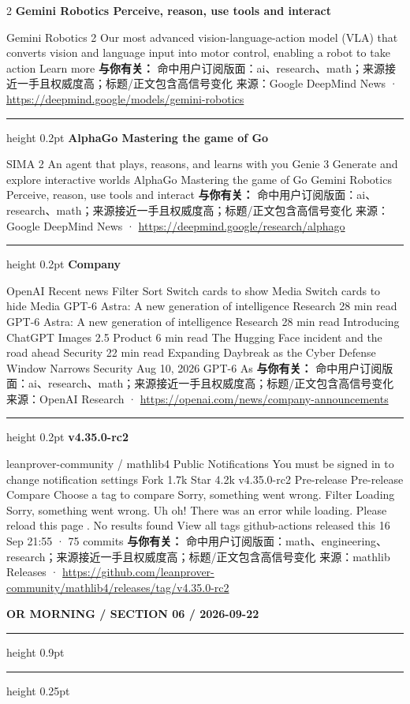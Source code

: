 \documentclass[10.5pt]{ctexart}
\begin{document}
\begin{multicols}{2}
{\large\bfseries Gemini Robotics Perceive, reason, use tools and interact}\par
Gemini Robotics 2 Our most advanced vision-language-action model (VLA) that converts vision and language input into motor control, enabling a robot to take action Learn more
\textbf{与你有关：} 命中用户订阅版面：ai、research、math；来源接近一手且权威度高；标题/正文包含高信号变化
{\footnotesize\color{ormuted} 来源：Google DeepMind News · \url{https://deepmind.google/models/gemini-robotics}}
\vspace{2mm}
\hrule height 0.2pt
\vspace{2mm}
{\large\bfseries AlphaGo Mastering the game of Go}\par
SIMA 2 An agent that plays, reasons, and learns with you Genie 3 Generate and explore interactive worlds AlphaGo Mastering the game of Go Gemini Robotics Perceive, reason, use tools and interact
\textbf{与你有关：} 命中用户订阅版面：ai、research、math；来源接近一手且权威度高；标题/正文包含高信号变化
{\footnotesize\color{ormuted} 来源：Google DeepMind News · \url{https://deepmind.google/research/alphago}}
\vspace{2mm}
\hrule height 0.2pt
\vspace{2mm}
{\large\bfseries Company}\par
OpenAI Recent news Filter Sort Switch cards to show Media Switch cards to hide Media GPT-6 Astra: A new generation of intelligence Research 28 min read GPT-6 Astra: A new generation of intelligence Research 28 min read Introducing ChatGPT Images 2.5 Product 6 min read The Hugging Face incident and the road ahead Security 22 min read Expanding Daybreak as the Cyber Defense Window Narrows Security Aug 10, 2026 GPT-6 As
\textbf{与你有关：} 命中用户订阅版面：ai、research、math；来源接近一手且权威度高；标题/正文包含高信号变化
{\footnotesize\color{ormuted} 来源：OpenAI Research · \url{https://openai.com/news/company-announcements}}
\vspace{2mm}
\hrule height 0.2pt
\vspace{2mm}
{\large\bfseries v4.35.0-rc2}\par
leanprover-community / mathlib4 Public Notifications You must be signed in to change notification settings Fork 1.7k Star 4.2k v4.35.0-rc2 Pre-release Pre-release Compare Choose a tag to compare Sorry, something went wrong. Filter Loading Sorry, something went wrong. Uh oh! There was an error while loading. Please reload this page . No results found View all tags github-actions released this 16 Sep 21:55 · 75 commits
\textbf{与你有关：} 命中用户订阅版面：math、engineering、research；来源接近一手且权威度高；标题/正文包含高信号变化
{\footnotesize\color{ormuted} 来源：mathlib Releases · \url{https://github.com/leanprover-community/mathlib4/releases/tag/v4.35.0-rc2}}
\end{multicols}
\newpage
{\small\bfseries OR MORNING / SECTION 06 / 2026-09-22}
\vspace{2mm}
\hrule height 0.9pt
\vspace{1.5mm}
\hrule height 0.25pt
\vspace{4mm}
\end{document}
